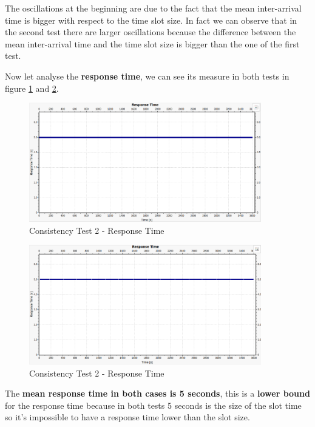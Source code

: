 \noindent The oscillations at the beginning are due to the fact that the mean inter-arrival time is bigger with respect to the time slot size. In fact we can observe that in the second test there are larger oscillations because the difference between the mean inter-arrival time and the time slot size is bigger than the one of the first test.

\noindent Now let analyse the \textbf{response time}, we can see its measure in both tests in figure \ref{img: consistencyTest1a_responsetime} and \ref{img: consistencyTest1b_responsetime}.

\begin{figure}[H]
	\centering
	\includegraphics[width=0.9\textwidth]{img/consistencytest1a_responsetime.png}
	\caption{Consistency Test 2 - Response Time}
	\label {img: consistencyTest1a_responsetime}
\end{figure}

\begin{figure}[H]
	\centering
	\includegraphics[width=0.9\textwidth]{img/consistencytest1b_responsetime.png}
	\caption{Consistency Test 2 - Response Time}
	\label {img: consistencyTest1b_responsetime}
\end{figure}


\noindent The \textbf{mean response time in both cases is 5 seconds}, this is a \textbf{lower bound} for the response time because in both tests 5 seconds is the size of the slot time so it's impossible to have a response time lower than the slot size.

